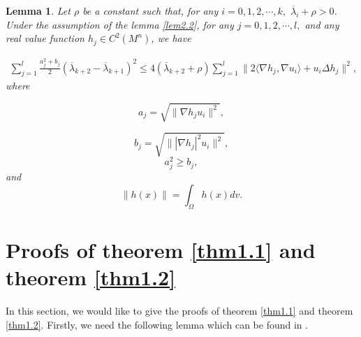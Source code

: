\documentclass[12pt]{article}
\newtheorem{lem}[thm]{Lemma}
\numberwithin{equation}{section}
\begin{document}
\begin{lem}\label{lem2.4}Let $\rho $ be a constant such that, for any $i=0,1,2,\cdots,k,$ $\overline{\lambda}_{i}+\rho>0$.
Under the assumption of the lemma \ref{lem2.2}, for any $j=0,1,2,\cdots,l,$ and any real value function $h_{j}\in C^{2}(M^{n})$,  we have

\begin{equation}\begin{aligned}\label{general-formula-4}\sum_{j=1}^{l}\frac{a_{j}^{2}+b_{j}}{2}\left(\overline{\lambda}_{k+2}-\overline{\lambda}_{k+1}\right)^{2}
\leq4(\overline{\lambda}_{k+2}+\rho)\sum_{j=1}^{l}\|2\langle\nabla h_{j},\nabla u_{i}\rangle+u_{i}\Delta h_{j}\|^{2}
,
\end{aligned}\end{equation}
where

\begin{equation*}a_{j}=\sqrt{\|\nabla h_{j}u_{i}\|^{2}},\end{equation*}

\begin{equation*}b_{j}=\sqrt{\||\nabla h_{j}|^{2}u_{i}\|^{2}},\end{equation*}
\begin{equation}a_{j}^{2}\geq b_{j},\end{equation}  and \begin{equation*}
\|h(x)\|=\int_{\Omega}h(x)dv.
\end{equation*}

\end{lem}


\section{Proofs of theorem \ref{thm1.1} and theorem \ref{thm1.2}}\label{sec3}
\vskip 3mm

In this section, we would like to give the proofs of theorem \ref{thm1.1} and theorem \ref{thm1.2}. Firstly, we need the
following lemma which can be
found in \cite{CC}.
\end{document}
